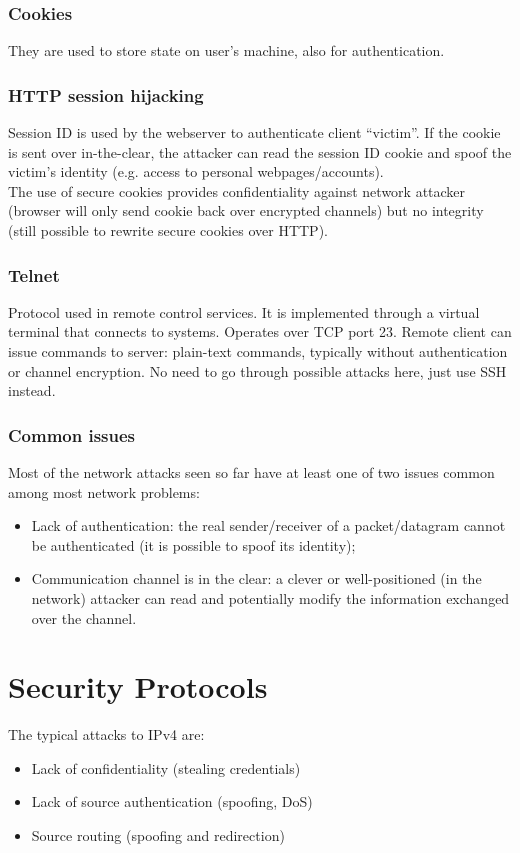 \documentclass[a4paper, 10pt, titlepage]{article}
\begin{document}
\subsubsection*{Cookies}
They are used to store state on user’s machine, also for authentication.

\subsubsection{HTTP session hijacking}
Session ID is used by the webserver to authenticate client “victim”. If the cookie is sent over in-the-clear, the attacker can read the session ID cookie and spoof the victim’s identity (e.g. access to personal webpages/accounts). \medskip\\
The use of secure cookies provides confidentiality against network attacker (browser will only send cookie back over encrypted channels) but no integrity (still possible to rewrite secure cookies over HTTP).

\subsubsection{Telnet}
Protocol used in remote control services. It is implemented through a virtual terminal that connects to systems. Operates over TCP port 23. Remote client can issue commands to server: plain-text commands, typically without authentication or channel encryption. No need to go through possible attacks here, just use SSH instead.

\subsubsection{Common issues}
Most of the network attacks seen so far have at least one of two issues common among most network problems:
\begin{itemize}
	\item Lack of authentication: the real sender/receiver of a packet/datagram cannot be authenticated (it is possible to spoof its identity);
	\item Communication channel is in the clear: a clever or well-positioned (in the network) attacker can read and 	potentially modify the information exchanged over the 	channel.
\end{itemize}

\newpage
\section{Security Protocols}
The typical attacks to IPv4 are:
\begin{itemize}
	\item Lack of confidentiality (stealing credentials)
	\item Lack of source authentication (spoofing, DoS)
	\item Source routing (spoofing and redirection)
\end{itemize}
\end{document}
